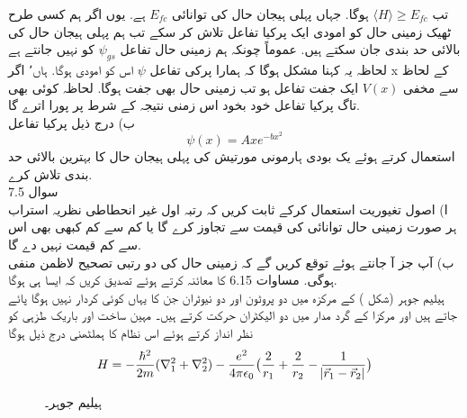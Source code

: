 تب
\(\langle H \rangle \ge E_{fc}\)
ہوگا. جہاں پہلی ہیجان حال کی توانائی
 \(E_{fc}\)
 ہے. یوں اگر ہم کسی طرح ٹھیک زمینی حال کو امودی ایک پرکیا تفاعل تلاش كر سکے تب ہم پہلی ہیجان حال کی بالائی حد بندی جان سکتے ہیں. عموماً چونکہ ہم زمینی حال تفاعل
 \(\psi_{gs}\)
  کو نہیں جانتے ہے لحاظہ یہ کہنا مشکل ہوگا کہ ہمارا پرکی تفاعل 
 \(\psi\)
   اس کو امودی ہوگا. ہاں٬ اگر x کے لحاظ سے مخفی
  \(V(x)\)
     ایک جفت تفاعل ہو تب زمینی حال بھی جفت ہوگا. لحاظہ کوئی بھی تاگ پرکیا تفاعل خود بخود اس زمنی نتیجہ کے شرط پر پورا اترے گا.\\
ب) درج ذیل پرکیا تفاعل
\[\psi(x)=Axe^{-bx^{2}}\]
استعمال کرتے ہوئے یک بودی ہارمونی مورتیش کی پہلی ہیجان حال کا بہترین بالائی حد بندی تلاش كرے.\\
سوال 7.5        \\
ا) اصول تغيوریت استعمال کرکے ثابت کریں کہ رتبہ اول غير انحطاطی نظریہ استراب ہر صورت زمینی حال توانائی کی قیمت سے تجاوز کرے گا يا كم سے كم کبھی بھی اس سے كم قیمت نہیں دے گا.\\
ب) آپ جز آ جانتے ہوئے توقع کریں گے کہ زمینی حال کی دو رتبی تصحیح لاظمن منفی ہوگی. مساوات 6.15 کا معائنہ كرتے ہوئے تصدیق كريں کہ ایسا ہی ہوگا. \\

ہیلیم جوہر   (شکل  ) کے مرکزہ میں دو پروٹون اور دو نیوٹران جن کا یہاں کوئی کردار نہیں ہوگا پائے جاتے ہیں اور مرکزا کے گرد مدار میں دو الیکٹران حرکت کرتے ہیں۔
مہین ساخت اور باریک طزہی کو نظر انداز کرتے ہوئے اس نظام کا ہملٹھنی درج ذیل ہوگا 
\[H=-\frac{\hbar^{2}}{2m}(\nabla_{1}^{2}+\nabla_{2}^{2})-\frac{e^{2}}{4\pi\epsilon_{0}}\big (\frac{2}{r_{1}}+\frac{2}{r_{2}}-\frac{1}{\abs{\vec{r}_{1}-\vec{r}_{2}}}\big )\]

\begin{figure}
\centering
{}
\caption{ہیلیم جوہر۔}
\label{شکل_تغیریت_ہیلیم_جوہر}
\end{figure}


